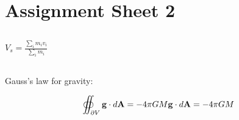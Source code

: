 \documentclass{report}
\begin{document}
\chapter{Assignment Sheet 2}

\section{}

\subsection{}
$V_s=\frac{\sum_i m_i v_i}{\sum_i m_i}$

\subsection{}

\subsection{}

\section{}
Gauss's law for gravity:

$$\oiint_{\displaystyle \scriptstyle \partial V} {\displaystyle \mathbf {g} \cdot d\mathbf {A} =-4\pi GM} \mathbf {g} \cdot d\mathbf {A} =-4\pi GM$$

\section{}

\subsection{}

\subsection{}
\end{document}
